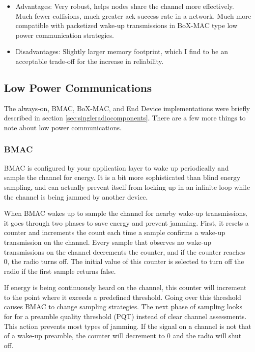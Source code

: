 \documentclass{article}
\begin{document}
\begin{itemize}
  \item Advantages: Very robust, helps nodes share the channel
  more effectively. Much fewer collisions, much greater ack success
  rate in a network. Much more compatible with packetized wake-up
  transmissions in BoX-MAC type low power communication strategies.
  \item Disadvantages: Slightly larger memory footprint, which I find
  to be an acceptable trade-off for the increase in reliability.
\end{itemize}

\subsection{Low Power Communications}
\label{sec:lpl}
The always-on, BMAC, BoX-MAC, and End Device implementations were briefly 
described in section \ref{sec:singleradiocomponents}.  There are a few more things
to note about low power communications.  

\subsubsection{BMAC}
\label{sec:bmac}
BMAC \cite{bmac} is configured by
your application layer to wake up periodically and sample the channel
for energy.  It is a bit more sophisticated than blind energy sampling, 
and can actually prevent itself from locking up in an infinite loop
while the channel is being jammed by another device.

When BMAC wakes up to sample the channel for nearby wake-up transmissions,
it goes through two phases to save energy and prevent jamming. First,
it resets a counter and increments the count each time a sample confirms a
wake-up transmission on the channel. Every sample that observes no wake-up 
transmissions on the channel decrements the counter, and if the counter reaches
0, the radio turns off.  The initial value of this counter is selected to 
turn off the radio if the first sample returns false.

If energy is being continuously heard on the channel, this counter will increment
to the point where it exceeds a predefined threshold. Going over this threshold
causes BMAC to change sampling strategies.  The next phase of sampling looks for
for a preamble quality threshold (PQT) instead of clear channel assessments.
This action prevents most types of jamming. If the signal on a channel is not
that of a wake-up preamble, the counter will decrement to 0 and the radio will
shut off.
\end{document}

